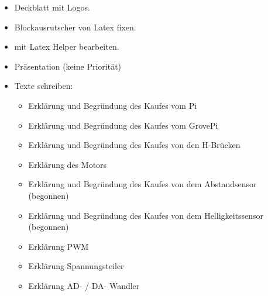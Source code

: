 \documentclass{article}
\begin{document}
\begin{itemize}

\item Deckblatt mit Logos.

\item Blockausrutscher von Latex fixen.

\item mit Latex Helper bearbeiten.

\item Pr\"{a}sentation (keine Priorität)


\item Texte schreiben:
\begin{itemize}

\item Erkl\"{a}rung und Begr\"{u}ndung des Kaufes vom Pi

\item Erkl\"{a}rung und Begr\"{u}ndung des Kaufes vom GrovePi

\item Erkl\"{a}rung und Begr\"{u}ndung des Kaufes von den H-Br\"{u}cken

\item Erkl\"{a}rung des Motors

\item Erkl\"{a}rung und Begr\"{u}ndung des Kaufes von dem Abstandsensor (begonnen)

\item Erkl\"{a}rung und Begr\"{u}ndung des Kaufes von dem Helligkeitssensor (begonnen)

\item Erkl\"{a}rung PWM

\item Erkl\"{a}rung Spannungsteiler

\item Erkl\"{a}rung AD- / DA- Wandler

\end{itemize}


\end{itemize}
\end{document}
